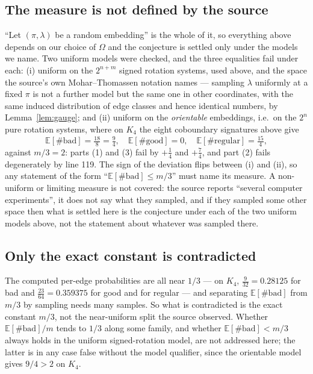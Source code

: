 \documentclass[11pt]{amsart}
\begin{document}
\subsection*{The measure is not defined by the source}
``Let $(\pi,\lambda)$ be a random embedding'' is the whole of it, so everything
above depends on our choice of $\Omega$ and the conjecture is settled only
under the models we name. Two uniform models were checked, and the three
equalities fail under each: (i) uniform on the $2^{n+m}$ signed
rotation systems, used above, and the space the source's own Mohar--Thomassen
notation names --- sampling $\lambda$ uniformly at a fixed $\pi$ is not a
further model but the same one in other coordinates, with the same induced
distribution of edge classes and hence identical numbers, by
Lemma~\ref{lem:gauge}; and (ii) uniform on the \emph{orientable}
embeddings, i.e.\ on the $2^{n}$ pure rotation systems, where on $K_4$ the
eight coboundary signatures above give
\[
 \mathbb{E}[\#\mathrm{bad}]=\tfrac{18}{8}=\tfrac94,\quad
 \mathbb{E}[\#\mathrm{good}]=0,\quad
 \mathbb{E}[\#\mathrm{regular}]=\tfrac{15}{4},
\]
against $m/3=2$: parts (1) and (3) fail by $+\tfrac14$ and $+\tfrac74$, and
part (2) fails degenerately by line 119. The sign of the deviation flips
between (i) and (ii), so any statement of the form
``$\mathbb{E}[\#\mathrm{bad}]\le m/3$'' must name its measure. A non-uniform or
limiting measure is not covered: the source reports ``several computer
experiments'', it does not say what they sampled, and if they sampled some
other space then what is settled here is the conjecture under each of the two
uniform models above, not the statement about whatever was sampled there.

\subsection*{Only the exact constant is contradicted}
The computed per-edge probabilities are all near $1/3$ --- on $K_4$,
$\tfrac{9}{32}=0.28125$ for bad and $\tfrac{23}{64}=0.359375$ for good and for
regular --- and separating $\mathbb{E}[\#\mathrm{bad}]$ from $m/3$ by sampling
needs many samples. So what is contradicted is the exact constant $m/3$, not
the near-uniform split the source observed. Whether
$\mathbb{E}[\#\mathrm{bad}]/m$ tends to $1/3$ along some family, and whether
$\mathbb{E}[\#\mathrm{bad}]<m/3$ always holds in the uniform signed-rotation
model, are not addressed here; the latter is in any case false without the
model qualifier, since the orientable model gives $9/4>2$ on $K_4$.
\end{document}
